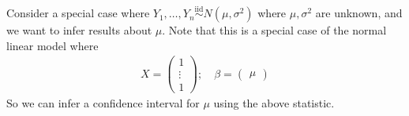 \begin{example}
	Consider a special case where $Y_1, \dots, Y_n \overset{\text{iid}}{\sim} N(\mu,\sigma^2)$ where $\mu, \sigma^2$ are unknown, and we want to infer results about $\mu$.
	Note that this is a special case of the normal linear model where
	\begin{align*}
		X = \begin{pmatrix}
			1      \\
			\vdots \\
			1
		\end{pmatrix};\quad \beta = \begin{pmatrix}
			\mu
		\end{pmatrix}
	\end{align*}
	So we can infer a confidence interval for $\mu$ using the above statistic.
\end{example}

